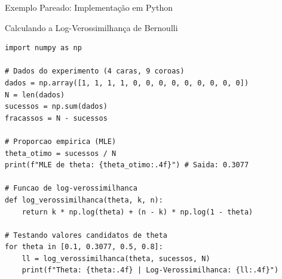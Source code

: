 \begin{frame}[fragile]{Exemplo Pareado: Implementação em Python}
    \begin{block}{Calculando a Log-Verossimilhança de Bernoulli}
\begin{lstlisting}
import numpy as np

# Dados do experimento (4 caras, 9 coroas)
dados = np.array([1, 1, 1, 1, 0, 0, 0, 0, 0, 0, 0, 0, 0])
N = len(dados)
sucessos = np.sum(dados)
fracassos = N - sucessos

# Proporcao empirica (MLE)
theta_otimo = sucessos / N
print(f"MLE de theta: {theta_otimo:.4f}") # Saida: 0.3077

# Funcao de log-verossimilhanca
def log_verossimilhanca(theta, k, n):
    return k * np.log(theta) + (n - k) * np.log(1 - theta)

# Testando valores candidatos de theta
for theta in [0.1, 0.3077, 0.5, 0.8]:
    ll = log_verossimilhanca(theta, sucessos, N)
    print(f"Theta: {theta:.4f} | Log-Verossimilhanca: {ll:.4f}")
\end{lstlisting}
    \end{block}
\end{frame}
